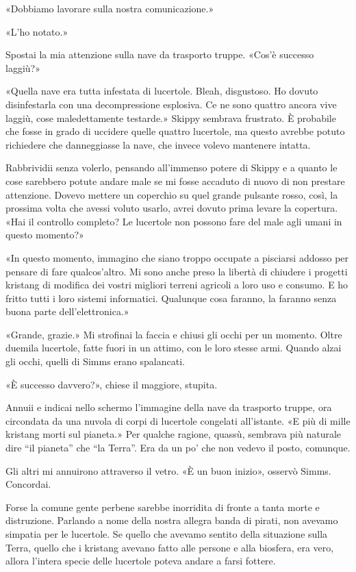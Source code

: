 «Dobbiamo lavorare sulla nostra comunicazione.»

«L'ho notato.»

Spostai la mia attenzione sulla nave da trasporto truppe. «Cos'è
successo laggiù?»

«Quella nave era tutta infestata di lucertole. Bleah, disgustoso. Ho
dovuto disinfestarla con una decompressione esplosiva. Ce ne sono
quattro ancora vive laggiù, cose maledettamente testarde.» Skippy
sembrava frustrato. È probabile che fosse in grado di uccidere quelle
quattro lucertole, ma questo avrebbe potuto richiedere che danneggiasse
la nave, che invece volevo mantenere intatta.

Rabbrividii senza volerlo, pensando all'immenso potere di Skippy e a
quanto le cose sarebbero potute andare male se mi fosse accaduto di
nuovo di non prestare attenzione. Dovevo mettere un coperchio su quel
grande pulsante rosso, così, la prossima volta che avessi voluto usarlo,
avrei dovuto prima levare la copertura. «Hai il controllo completo? Le
lucertole non possono fare del male agli umani in questo momento?»

«In questo momento, immagino che siano troppo occupate a pisciarsi
addosso per pensare di fare qualcos'altro. Mi sono anche preso la
libertà di chiudere i progetti kristang di modifica dei vostri migliori
terreni agricoli a loro uso e consumo. E ho fritto tutti i loro sistemi
informatici. Qualunque cosa faranno, la faranno senza buona parte
dell'elettronica.»

«Grande, grazie.» Mi strofinai la faccia e chiusi gli occhi per un
momento. Oltre duemila lucertole, fatte fuori in un attimo, con le loro
stesse armi. Quando alzai gli occhi, quelli di Simms erano spalancati.

«È successo davvero?», chiese il maggiore, stupita.

Annuii e indicai nello schermo l'immagine della nave da trasporto
truppe, ora circondata da una nuvola di corpi di lucertole congelati
all'istante. «E più di mille kristang morti sul pianeta.» Per qualche
ragione, quassù, sembrava più naturale dire ``il pianeta'' che ``la
Terra''. Era da un po' che non vedevo il posto, comunque.

Gli altri mi annuirono attraverso il vetro. «È un buon inizio», osservò
Simms. Concordai.

Forse la comune gente perbene sarebbe inorridita di fronte a tanta morte
e distruzione. Parlando a nome della nostra allegra banda di pirati, non
avevamo simpatia per le lucertole. Se quello che avevamo sentito della
situazione sulla Terra, quello che i kristang avevano fatto alle persone
e alla biosfera, era vero, allora l'intera specie delle lucertole poteva
andare a farsi fottere.

